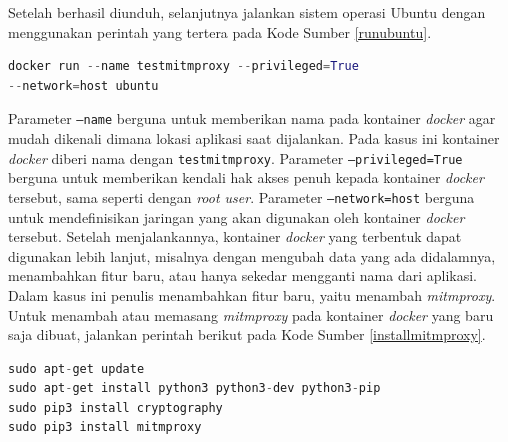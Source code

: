 Setelah berhasil diunduh, selanjutnya jalankan sistem operasi Ubuntu dengan menggunakan perintah yang tertera pada Kode Sumber \ref{runubuntu}.
\newline
\begin{lstlisting}[frame=single,tabsize=2,breaklines,captionpos=b,caption=Perintah untuk Menjalankan \textit{Image} Ubuntu,language=Python,label=runubuntu]
docker run --name testmitmproxy --privileged=True 
--network=host ubuntu
\end{lstlisting}
Parameter \texttt{--name} berguna untuk memberikan nama pada kontainer \textit{docker} agar mudah dikenali dimana lokasi aplikasi saat dijalankan. Pada kasus ini kontainer \textit{docker} diberi nama dengan \texttt{testmitmproxy}. Parameter \texttt{--privileged=True} berguna untuk memberikan kendali hak akses penuh kepada kontainer \textit{docker} tersebut, sama seperti dengan \textit{root user}. Parameter \texttt{--network=host} berguna untuk mendefinisikan jaringan yang akan digunakan oleh kontainer \textit{docker} tersebut. Setelah menjalankannya, kontainer \textit{docker} yang terbentuk dapat digunakan lebih lanjut, misalnya dengan mengubah data yang ada didalamnya, menambahkan fitur baru, atau hanya sekedar mengganti nama dari aplikasi.\\
\indent Dalam kasus ini penulis menambahkan fitur baru, yaitu menambah \textit{mitmproxy}. Untuk menambah atau memasang \textit{mitmproxy} pada kontainer \textit{docker} yang baru saja dibuat, jalankan perintah berikut pada Kode Sumber \ref{installmitmproxy}.
\newline
\begin{lstlisting}[frame=single,tabsize=2,breaklines,captionpos=b,caption=Perintah untuk Pemasangan \textit{Mitmproxy},language=Python,label=installmitmproxy]
sudo apt-get update
sudo apt-get install python3 python3-dev python3-pip
sudo pip3 install cryptography
sudo pip3 install mitmproxy
\end{lstlisting}

